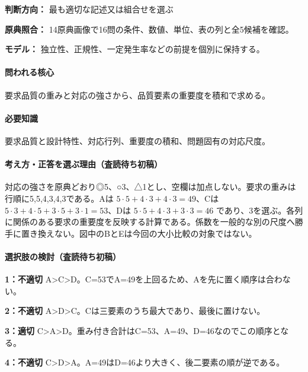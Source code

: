 \noindent\textbf{判断方向：} 最も適切な記述又は組合せを選ぶ\par

\noindent\textbf{原典照合：} 14原典画像で16問の条件、数値、単位、表の列と全5候補を確認。\par

\noindent\textbf{モデル：} 独立性、正規性、一定発生率などの前提を個別に保持する。\par

\paragraph{問われる核心} 要求品質の重みと対応の強さから、品質要素の重要度を積和で求める。

\paragraph{必要知識} 要求品質と設計特性、対応行列、重要度の積和、問題固有の対応尺度。

\paragraph{考え方・正答を選ぶ理由（査読待ち初稿）} 対応の強さを原典どおり◎5、○3、△1とし、空欄は加点しない。要求の重みは行順に5,5,4,3,4,3である。Aは \(5\cdot5+4\cdot3+4\cdot3=49\)、Cは \(5\cdot3+4\cdot5+3\cdot5+3\cdot1=53\)、Dは \(5\cdot5+4\cdot3+3\cdot3=46\) であり、3を選ぶ。各列に関係のある要求の重要度を反映する計算である。係数を一般的な別の尺度へ勝手に置き換えない。図中のBとEは今回の大小比較の対象ではない。

\paragraph{選択肢の検討（査読待ち初稿）}\mbox{}\par

\noindent\textbf{1：不適切} A>C>D。C=\allowbreak{}53でA=\allowbreak{}49を上回るため、Aを先に置く順序は合わない。\par

\noindent\textbf{2：不適切} A>D>C。Cは三要素のうち最大であり、最後に置けない。\par

\noindent\textbf{3：適切} C>A>D。重み付き合計はC=\allowbreak{}53、A=\allowbreak{}49、D=\allowbreak{}46なのでこの順序となる。\par

\noindent\textbf{4：不適切} C>D>A。A=\allowbreak{}49はD=\allowbreak{}46より大きく、後二要素の順が逆である。\par

